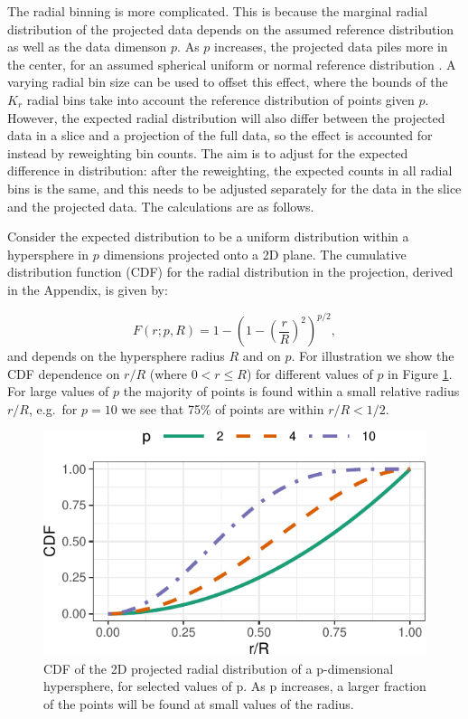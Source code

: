 \documentclass[]{interact}
\theoremstyle{plain}%
\theoremstyle{definition}
\theoremstyle{remark}
\begin{document}
The radial binning is more complicated. This is because the marginal
radial distribution of the projected data depends on the assumed
reference distribution as well as the data dimenson \(p\). As \(p\)
increases, the projected data piles more in the center, for an assumed
spherical uniform or normal reference distribution \citep{burningsage}.
A varying radial bin size can be used to offset this effect, where the
bounds of the \(K_r\) radial bins take into account the reference
distribution of points given \(p\). However, the expected radial
distribution will also differ between the projected data in a slice and
a projection of the full data, so the effect is accounted for instead by
reweighting bin counts. The aim is to adjust for the expected difference
in distribution: after the reweighting, the expected counts in all
radial bins is the same, and this needs to be adjusted separately for
the data in the slice and the projected data. The calculations are as
follows.

Consider the expected distribution to be a uniform distribution within a
hypersphere in \(p\) dimensions projected onto a 2D plane. The
cumulative distribution function (CDF) for the radial distribution in
the projection, derived in the Appendix, is given by:

\begin{equation}
F(r;p,R) = 1-\left(1-\left(\frac{r}{R}\right)^2\right)^{p/2},
\label{eq:cdf}
\end{equation} and depends on the hypersphere radius \(R\) and on \(p\).
For illustration we show the CDF dependence on \(r/R\) (where
\(0<r\leq R\)) for different values of \(p\) in Figure \ref{fig:cdf}.
For large values of \(p\) the majority of points is found within a small
relative radius \(r/R\), e.g.~for \(p=10\) we see that 75\% of points
are within \(r/R<1/2\).

\begin{figure}

{\centering \includegraphics[width=0.5\linewidth]{section_pursuit_files/figure-latex/cdf-1} 

}

\caption{CDF of the 2D projected radial distribution of a p-dimensional hypersphere, for selected values of p. As p increases, a larger fraction of the points will be found at small values of the radius.}\label{fig:cdf}
\end{figure}
\end{document}
